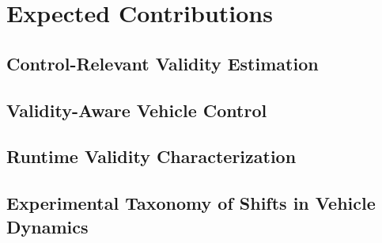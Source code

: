 \documentclass[12pt,a4paper]{report}
\begin{document}

\chapter{Expected Contributions}


\section{Control-Relevant Validity Estimation}


\section{Validity-Aware Vehicle Control}


\section{Runtime Validity Characterization}


\section{Experimental Taxonomy of Shifts in Vehicle Dynamics}

\end{document}
